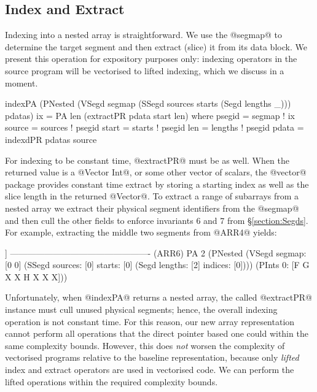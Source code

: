 \subsection{Index and Extract}
\label{section:IndexExtract}
Indexing into a nested array is straightforward. We use the @segmap@ to determine the target segment and then extract (slice) it from its data block. We present this operation for expository purposes only: indexing operators in the source program will be vectorised to lifted indexing, which we discuss in a moment.
\par
\begin{small}
\begin{code}
 indexPA (PNested (VSegd segmap 
                  (SSegd sources starts
                  (Segd  lengths _))) pdatas) ix
  = PA len (extractPR pdata start len)        
  where psegid  = segmap  ! ix
        source  = sources ! psegid
        start   = starts  ! psegid
        len     = lengths ! psegid
        pdata   = indexdPR pdatas source
\end{code}
\end{small}
For indexing to be constant time, @extractPR@ must be as well. When the returned value is a @Vector Int@, or some other vector of scalars, the @vector@ package provides constant time extract by storing a starting index as well as the slice length in the returned @Vector@. To extract a range of subarrays from a nested array we extract their physical segment identifiers from the @segmap@ and then cull the other fields to enforce invariants 6 and 7 from \S\ref{section:Segds}. For example, extracting the middle two segments from @ARR4@ yields:
\par
\begin{small}
\begin{code}
                    [[F G] [F G]]
 ------------------------------------------------- (ARR6)
   PA 2 (PNested
    (VSegd  segmap: [0 0]
    (SSegd sources: [0]    starts: [0] 
    (Segd  lengths: [2]   indices: [0])))
    (PInts 0: [F G X X H X X X]))
\end{code}
\end{small}
%
Unfortunately, when @indexPA@ returns a nested array, the called @extractPR@ instance must cull unused physical segments; hence, the overall indexing operation is not constant time. For this reason, our new array representation cannot perform all operations that the direct pointer based one could within the same complexity bounds. However, this does \emph{not} worsen the complexity of vectorised programs relative to the baseline representation, because only \emph{lifted} index and extract operators are used in vectorised code. We can perform the lifted operations within the required complexity bounds. 

